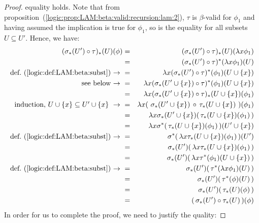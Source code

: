 \begin{proof}
    equality holds. Note that from 
    proposition~(\ref{logic:prop:LAM:beta:valid:recursion:lam:2}), $\tau$ is
    $\beta$-valid for $\phi_{1}$ and having assumed the implication is true
    for $\phi_{1}$, so is the equality for all subsets $U\subseteq U'$.
    Hence, we have:
        \begin{eqnarray*}(\sigma_{*}(U')\circ\tau)_{*}(U)(\phi)
            &=&(\sigma_{*}(U')\circ\tau)_{*}(U)(\lambda x\phi_{1})\\
            &=&(\sigma_{*}(U')\circ\tau)^{*}(\lambda x\phi_{1})(U)\\
            \mbox{def.~(\ref{logic:def:LAM:beta:subst})\ $\to$\ }
            &=&\lambda x(\sigma_{*}(U')\circ\tau)^{*}(\phi_{1})(U\cup\{x\})\\
            \mbox{see below\ $\to$\ }
            &=&\lambda x(\sigma_{*}(U'\cup\{x\})\circ
                         \tau)^{*}(\phi_{1})(U\cup\{x\})\\
            &=&\lambda x(\sigma_{*}(U'\cup\{x\})\circ
                         \tau)_{*}(U\cup\{x\})(\phi_{1})\\
            \mbox{induction, $U\cup\{x\}\subseteq U'\cup\{x\}\ \to\ $}
            &=&\lambda x(\ \sigma_{*}(U'\cup\{x\})\,\circ\,
                           \tau_{*}(U\cup\{x\})\ )(\phi_{1})\\
            &=&\lambda x \sigma_{*}(U'\cup\{x\})(\,
                         \tau_{*}(U\cup\{x\})(\phi_{1})\,)\\
            &=&\lambda x \sigma^{*}(\,\tau_{*}(U\cup\{x\})(\phi_{1})\,)
                         (U'\cup\{x\})\\
            \mbox{def.~(\ref{logic:def:LAM:beta:subst})\ $\to$\ }
            &=&\sigma^{*}(\,\lambda x\tau_{*}(U\cup\{x\})(\phi_{1})\,)(U')\\
            &=&\sigma_{*}(U')(\,\lambda x\tau_{*}(U\cup\{x\})(\phi_{1})\,)\\
            &=&\sigma_{*}(U')(\,\lambda x\tau^{*}(\phi_{1})(U\cup\{x\})\,)\\
            \mbox{def.~(\ref{logic:def:LAM:beta:subst})\ $\to$\ }
            &=&\sigma_{*}(U')(\,\tau^{*}(\lambda x\phi_{1})(U)\,)\\
            &=&\sigma_{*}(U')(\,\tau^{*}(\phi)(U)\,)\\
            &=&\sigma_{*}(U')(\,\tau_{*}(U)(\phi)\,)\\
            &=&(\,\sigma_{*}(U')\circ\tau_{*}(U)\,)(\phi)
        \end{eqnarray*}
    In order for us to complete the proof, we need to justify the quality:

\end{proof}
